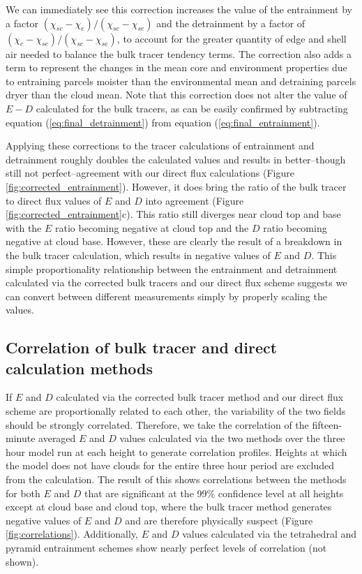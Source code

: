 \documentclass[12pt]{article}
\begin{document}
We can immediately see this correction increases the value of the entrainment 
by a factor $(\chi_{sc} - \chi_e)/(\chi_{sc} - \chi_{se})$ and the detrainment 
by a factor of $(\chi_c - \chi_{se})/(\chi_{sc} - \chi_{se})$, to account for 
the greater quantity of edge and shell air needed to balance the bulk tracer 
tendency terms.  The correction also adds a term to represent the changes in 
the mean core and environment properties due to entraining parcels moister than 
the environmental mean and detraining parcels dryer than the cloud mean.  Note 
that this correction does not alter the value of $E-D$ calculated for the bulk 
tracers, as can be easily confirmed by subtracting equation 
(\ref{eq:final_detrainment}) from equation (\ref{eq:final_entrainment}).

Applying these corrections to the tracer calculations of entrainment and 
detrainment roughly doubles the calculated values and results in better--though 
still not perfect--agreement with our direct flux calculations (Figure 
\ref{fig:corrected_entrainment}).  However, it does bring the ratio of the bulk 
tracer to direct flux values of $E$ and $D$ into agreement (Figure 
\ref{fig:corrected_entrainment}c).  This ratio still diverges near cloud top 
and base with the $E$ ratio becoming negative at cloud top and the $D$ ratio 
becoming negative at cloud base.  However, these are clearly the result of a
breakdown in the bulk tracer calculation, which results in negative values 
of $E$ and $D$.  This simple proportionality relationship between the 
entrainment and detrainment calculated via the corrected bulk tracers and our 
direct flux scheme suggests we can convert between different measurements 
simply by properly scaling the values.


\subsection{Correlation of bulk tracer and direct calculation methods}

If $E$ and $D$ calculated via the corrected bulk tracer method and our direct 
flux scheme are proportionally related to each other, the variability of the two 
fields should be strongly correlated.  Therefore, we take the correlation of 
the fifteen-minute averaged $E$ and $D$ values calculated via the two methods 
over the three hour model run at each height to generate correlation profiles.  
Heights at which the model does not have clouds for the entire three hour 
period are excluded from the calculation.  The result of this shows 
correlations between the methods for both $E$ and $D$ that are significant at 
the 99\% confidence level at all heights except at cloud base and cloud top, 
where the bulk tracer method generates negative values of $E$ and $D$ and are 
therefore physically suspect (Figure \ref{fig:correlations}).  Additionally, 
$E$ and $D$ values calculated via the tetrahedral and pyramid entrainment 
schemes show nearly perfect levels of correlation (not shown).
\end{document}
